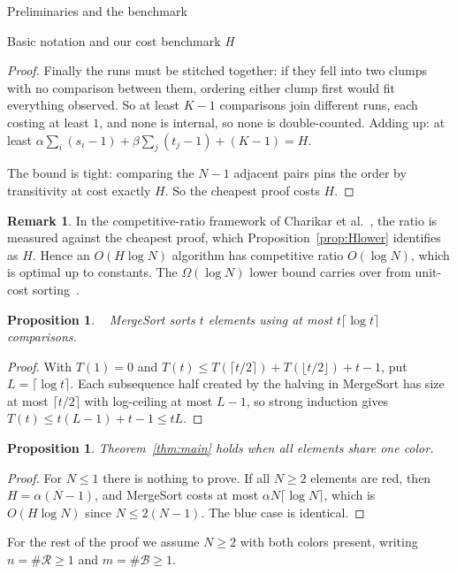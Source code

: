 \documentclass[11pt]{article}
\newcommand{\cR}{\mathcal R}
\newcommand{\cB}{\mathcal B}
\newtheorem{prop}[thm]{Proposition}
\theoremstyle{definition}
\newtheorem{rem}[thm]{Remark}
\numberwithin{equation}{section}
\begin{document}
\begin{section}{Preliminaries and the benchmark}
\begin{subsection}{Basic notation and our cost benchmark {\em H}}
\begin{aiblock}
\begin{proof}
Finally the runs must be stitched together: if they fell into two
clumps with no comparison between them, ordering either clump first
would fit everything observed. So at least $K-1$ comparisons join
different runs, each costing at least $1$, and none is internal, so
none is double-counted. Adding up: at least
$\alpha\sum_i(s_i-1) + \beta\sum_j(t_j-1) + (K-1) = H$.

The bound is tight: comparing the $N-1$ adjacent pairs pins the
order by transitivity at cost exactly $H$. So the cheapest proof
costs $H$.
\end{proof}
\end{aiblock}
\end{subsection}
\begin{aiblock}
\begin{rem}
In the competitive-ratio framework of Charikar et
al.~\cite{charikar2000query}, the ratio is measured against the
cheapest proof, which Proposition~\ref{prop:Hlower} identifies as
$H$. Hence an $O(H \log N)$ algorithm has competitive ratio
$O(\log N)$, which is optimal up to constants. The $\Omega(\log N)$
lower bound carries over from unit-cost
sorting~\cite{goswami2024bichromatic}.
\end{rem}

\begin{prop}\label{prop:MergeSort}{\normalfont ~\cite{knuth1998art}}
{\ttfamily MergeSort} sorts $t$ elements using at most $t\lceil\log t\rceil$
comparisons.
\end{prop}
\begin{proof}
With $T(1) = 0$ and
$T(t) \le T(\lceil t/2\rceil) + T(\lfloor t/2\rfloor) + t - 1$,
put $L = \lceil\log t\rceil$. Each subsequence half created by the halving in {\ttfamily MergeSort} has size at most
$\lceil t/2\rceil$ with log-ceiling at most $L-1$, so strong
induction gives $T(t) \le t(L-1) + t - 1 \le tL$.
\end{proof}

\begin{prop}\label{prop:onecolor}
Theorem~\ref{thm:main} holds when all elements share one color.
\end{prop}
\begin{proof}
For $N \le 1$ there is nothing to prove. If all $N \ge 2$ elements
are red, then $H = \alpha(N-1)$, and {\ttfamily MergeSort} costs at most
$\alpha N\lceil\log N\rceil$, which is $O(H \log N)$ since
$N \le 2(N-1)$. The blue case is identical.
\end{proof}

For the rest of the proof we assume $N \ge 2$ with both colors
present, writing $n = \#\cR \ge 1$ and $m = \#\cB \ge 1$.
\end{aiblock}
\end{section}
\end{document}
